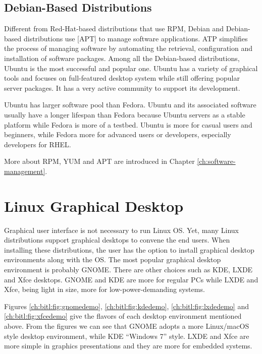 \subsection{Debian-Based Distributions}

Different from Red-Hat-based distributions that use RPM, Debian and Debian-based distributions use [APT] to manage software applications. ATP simplifies the process of managing software by automating the retrieval, configuration and installation of software packages. Among all the Debian-based distributions, Ubuntu is the most successful and popular one. Ubuntu has a variety of graphical tools and focuses on full-featured desktop system while still offering popular server packages. It has a very active community to support its development.

Ubuntu has larger software pool than Fedora. Ubuntu and its associated software usually have a longer lifespan than Fedora because Ubuntu servers as a stable platform while Fedora is more of a testbed. Ubuntu is more for casual users and beginners, while Fedora more for advanced users or developers, especially developers for RHEL.

More about RPM, YUM and APT are introduced in Chapter \ref{ch:software-management}.

\section{Linux Graphical Desktop}

Graphical user interface is not necessary to run Linux OS. Yet, many Linux distributions support graphical desktops to convene the end users. When installing these distributions, the user has the option to install graphical desktop environments along with the OS. The most popular graphical desktop environment is probably GNOME. There are other choices such as KDE, LXDE and Xfce desktops. GNOME and KDE are more for regular PCs while LXDE and Xfce, being light in size, more for low-power-demanding systems.

Figures \ref{ch:bitl:fig:gnomedemo}, \ref{ch:bitl:fig:kdedemo}, \ref{ch:bitl:fig:lxdedemo} and \ref{ch:bitl:fig:xfcedemo} give the flavors of each desktop environment mentioned above. From the figures we can see that GNOME adopts a more Linux/macOS style desktop environment, while KDE ``Windows 7'' style. LXDE and Xfce are more simple in graphics presentations and they are more for embedded systems.

